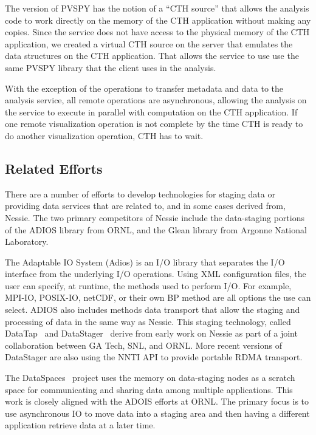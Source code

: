 The \insitu version of PVSPY has the notion of a ``CTH source'' that allows the
analysis code to work directly on the memory of the CTH application without
making any copies.   Since the \intransit service does not have access to the
physical memory of the CTH application, we created a virtual CTH source on the
server that emulates the data structures on the CTH application.  That allows
the service to use use the same PVSPY library that the client uses in the \insitu
analysis.  

With the exception of the operations to transfer metadata and data to the analysis
service, all remote operations are asynchronous, allowing the analysis on the 
service to execute in parallel with computation on the CTH application.  If one
remote visualization operation is not complete by the time CTH is ready to do another
visualization operation, CTH has to wait. 


\subsection{Related Efforts}

There are a number of efforts to develop technologies for staging data or 
providing data services that are related to, and in some cases derived from,
Nessie.  The two primary competitors of Nessie include the data-staging
portions of the ADIOS library from ORNL, and the Glean library from Argonne
National Laboratory. 

The Adaptable IO System (Adios) is an I/O library that separates the I/O
interface from the underlying I/O operations.  Using XML configuration 
files, the user can specify, at runtime, the methods used to perform I/O.
For example, MPI-IO, POSIX-IO, netCDF, or their own BP method are all options
the use can select.  ADIOS also includes methods data transport that allow
the staging and processing of data in the same way as Nessie.  This staging
technology, called DataTap~\cite{datatap2009cluster} and
DataStager~\cite{abbasi:2010:datastager} derive from early work on Nessie as
part of a joint collaboration between GA Tech, SNL, and ORNL.  More recent
versions of DataStager are also using the NNTI API to provide portable 
RDMA transport. 

The DataSpaces~\cite{docan:2010:dataspaces} project uses the memory on
data-staging nodes as a scratch space for communicating and sharing 
data among multiple applications.  This work is closely aligned with the 
ADOIS efforts at ORNL.  The primary focus is to use asynchronous IO to
move data into a staging area and then having a
different application retrieve data at a later time.

